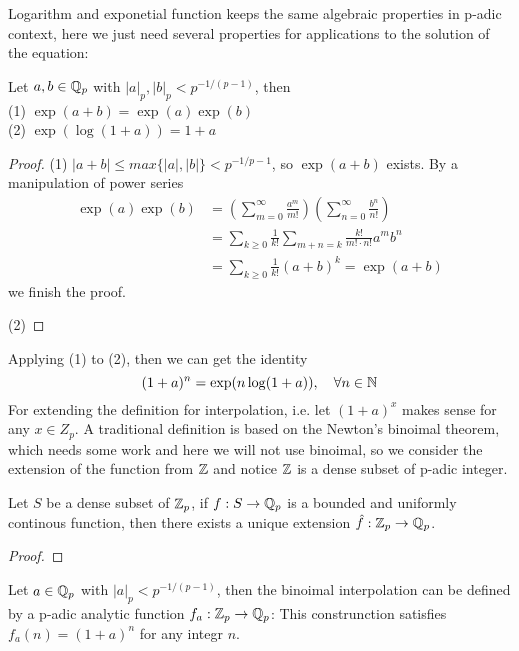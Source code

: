 Logarithm and exponetial function keeps the same algebraic properties in p-adic context, here we just need several properties for applications to the solution of the equation:
\begin{proposition}
    Let \(a,b \in \mathbb{Q}_p\) with \(|a|_p, |b|_p < p^{-1/(p-1)} \), then\\
    (1) \(\exp (a+b)  = \exp (a) \exp(b)\) \\
    (2) \(\exp (\log (1+a)) = 1+a\)
    \begin{proof}
        (1) \(|a+b|\leq max \{|a|,|b|\}<p^{-1/p-1}\), so \(\exp(a+b)\) exists. By a manipulation of power series
        \begin{align*}
           \exp(a)\exp(b) &= (\sum_{m=0}^{\infty}\frac{a^m}{m!})(\sum_{n=0}^{\infty}\frac{b^n}{n!}) \\
           &= \sum_{k\geq 0}\frac{1}{k!}\sum_{m+n=k}\frac{k!}{m!\cdot n!}a^mb^n\\
           &= \sum_{k\geq 0}\frac{1}{k!}(a+b)^k = \exp(a+b)
        \end{align*}
        we finish the proof.

        (2) 
        
    \end{proof}
\end{proposition}

Applying (1) to (2), then we can get the identity
\[(1+a)^n = \exp(n \log(1+a)), \quad \forall n \in \mathbb{N}\]
For extending the definition for interpolation, i.e. let \((1+a)^x\) makes sense for any \(x \in Z_p\). A traditional definition is based on the Newton's binoimal theorem, which needs some work and here we will not use binoimal, so we consider the extension of the function from \(\mathbb{Z}\) and notice \(\mathbb{Z}\) is a dense subset of p-adic integer.

\begin{proposition}
    Let \(S\) be a dense subset of \(\mathbb{Z}_p\), if \(f: S \to \mathbb{Q}_p\) is a bounded and uniformly continous function, then there exists a unique extension \(\hat{f}: \mathbb{Z}_p \to \mathbb{Q}_p\).

    \begin{proof}
        
    \end{proof}

\end{proposition}

\begin{definition}
    Let \(a \in \mathbb{Q}_p\) with \(|a|_p < p^{-1/(p-1)}\), then the binoimal interpolation can be defined by a p-adic analytic function \(f_a: \mathbb{Z}_p \to \mathbb{Q}_p\):     
    This construnction satisfies \(f_a(n) = (1+a)^n\) for any integr \(n\).
\end{definition}

